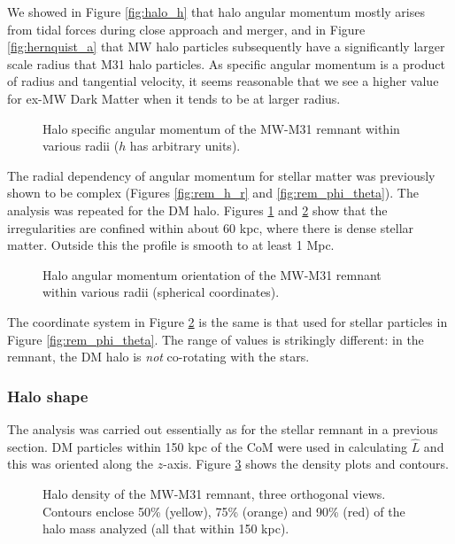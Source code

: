 \documentclass[twocolumn]{aastex63}
\begin{document}
We showed in Figure \ref{fig:halo_h} that halo angular momentum mostly arises from tidal forces during close approach and merger, and in Figure \ref{fig:hernquist_a} that MW halo particles subsequently have a significantly larger scale radius that M31 halo particles. As specific angular momentum is a product of radius and tangential velocity, it seems reasonable that we see a higher value for ex-MW Dark Matter when it tends to be at larger radius. 

\begin{figure}[htb!]
	\caption{Halo specific angular momentum of the MW-M31 remnant within various radii ($h$ has arbitrary units).
		\label{fig:rem_dm_h_r}}
\end{figure}

The radial dependency of angular momentum for stellar matter was previously shown to be complex (Figures \ref{fig:rem_h_r} and \ref{fig:rem_phi_theta}). The analysis was repeated for the DM halo. Figures \ref{fig:rem_dm_h_r} and \ref{fig:rem_dm_phi_theta} show that the irregularities are confined within about 60 kpc, where there is dense stellar matter. Outside this the profile is smooth to at least 1 Mpc.
	
\begin{figure}[htb!]
	\caption{Halo angular momentum orientation of the MW-M31 remnant within various radii (spherical coordinates).
		\label{fig:rem_dm_phi_theta}}
\end{figure}

The coordinate system in Figure \ref{fig:rem_dm_phi_theta} is the same is that used for stellar particles in Figure \ref{fig:rem_phi_theta}. The range of values is strikingly different: in the remnant, the DM halo is \textit{not} co-rotating with the stars.
	
\subsubsection{Halo shape}	

The analysis was carried out essentially as for the stellar remnant in a previous section. DM particles within 150 kpc of the CoM were used in calculating $\hat{L}$ and this was oriented along the $z$-axis. Figure \ref{fig:rem_dm_shape_150} shows the density plots and contours.

\begin{figure}[htb!]
	\caption{Halo density of the MW-M31 remnant, three orthogonal views. Contours enclose 50\% (yellow), 75\% (orange) and 90\% (red) of the halo mass analyzed (all that within 150 kpc).
		\label{fig:rem_dm_shape_150}}
\end{figure}
\end{document}

